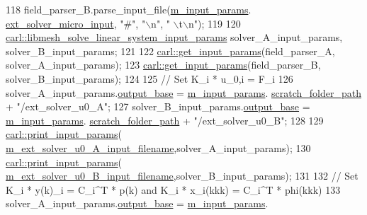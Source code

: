 \begin{DoxyCode}
118     field\_parser\_B.parse\_input\_file(\hyperlink{classcarl_1_1_solver___files___setup_aa5804bf6c6e506b382766333f232d3d5}{m\_input\_params}.
      \hyperlink{structcarl_1_1feti__setup__init__params_a27dfcdd54488314398184e8f7a989ab2}{ext\_solver\_micro\_input}, \textcolor{stringliteral}{"#"}, \textcolor{stringliteral}{"\(\backslash\)n"}, \textcolor{stringliteral}{" \(\backslash\)t\(\backslash\)n"});
119 
120     \hyperlink{structcarl_1_1libmesh__solve__linear__system__input__params}{carl::libmesh\_solve\_linear\_system\_input\_params} 
      solver\_A\_input\_params, solver\_B\_input\_params;
121 
122     \hyperlink{namespacecarl_a902f88f3c52c6fc9c974bc99832e78a7}{carl::get\_input\_params}(field\_parser\_A, solver\_A\_input\_params);
123     \hyperlink{namespacecarl_a902f88f3c52c6fc9c974bc99832e78a7}{carl::get\_input\_params}(field\_parser\_B, solver\_B\_input\_params);
124 
125     \textcolor{comment}{// Set K\_i * u\_0,i  = F\_i}
126     solver\_A\_input\_params.\hyperlink{structcarl_1_1libmesh__solve__linear__system__input__params_a8ef071dca667af6aeafc942ff15df7ad}{output\_base} = \hyperlink{classcarl_1_1_solver___files___setup_aa5804bf6c6e506b382766333f232d3d5}{m\_input\_params}.
      \hyperlink{structcarl_1_1feti__setup__init__params_a57e553748427905076bae85d239f9537}{scratch\_folder\_path} + \textcolor{stringliteral}{"/ext\_solver\_u0\_A"};
127     solver\_B\_input\_params.\hyperlink{structcarl_1_1libmesh__solve__linear__system__input__params_a8ef071dca667af6aeafc942ff15df7ad}{output\_base} = \hyperlink{classcarl_1_1_solver___files___setup_aa5804bf6c6e506b382766333f232d3d5}{m\_input\_params}.
      \hyperlink{structcarl_1_1feti__setup__init__params_a57e553748427905076bae85d239f9537}{scratch\_folder\_path} + \textcolor{stringliteral}{"/ext\_solver\_u0\_B"};
128 
129     \hyperlink{namespacecarl_ada1b77b2d0f0c7274a9457ba20e16a68}{carl::print\_input\_params}(
      \hyperlink{classcarl_1_1_solver___files___setup_a32c0d90d116aab36f712795956403913}{m\_ext\_solver\_u0\_A\_input\_filename},solver\_A\_input\_params);
130     \hyperlink{namespacecarl_ada1b77b2d0f0c7274a9457ba20e16a68}{carl::print\_input\_params}(
      \hyperlink{classcarl_1_1_solver___files___setup_a682f749b73abaaffa3fdcd8b272eda2e}{m\_ext\_solver\_u0\_B\_input\_filename},solver\_B\_input\_params);
131 
132     \textcolor{comment}{// Set K\_i * y(k)\_i = C\_i^T * p(k) and K\_i * x\_i(kkk)  = C\_i^T * phi(kkk)}
133     solver\_A\_input\_params.\hyperlink{structcarl_1_1libmesh__solve__linear__system__input__params_a8ef071dca667af6aeafc942ff15df7ad}{output\_base} = \hyperlink{classcarl_1_1_solver___files___setup_aa5804bf6c6e506b382766333f232d3d5}{m\_input\_params}.

\end{DoxyCode}
